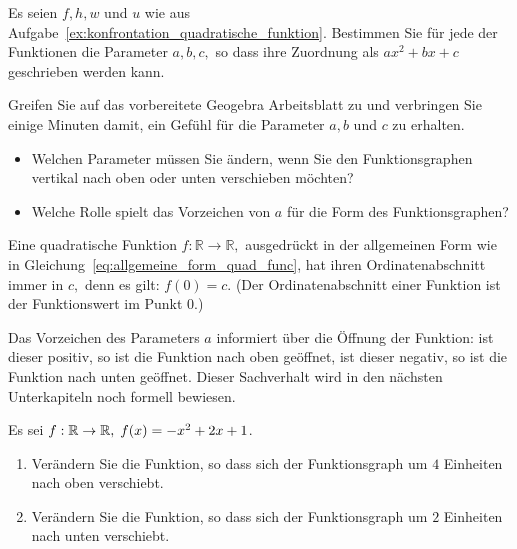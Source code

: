 \documentclass[12pt]{article}
\begin{document}
\begin{exercise}\label{ex:quad_func_allgemein_params}
Es seien $f, h, w$ und $u$ wie aus Aufgabe~\ref{ex:konfrontation_quadratische_funktion}. Bestimmen Sie für jede der Funktionen die Parameter $a,b,c,$ so dass ihre Zuordnung als $ax^2 + bx + c$ geschrieben werden kann.
\end{exercise}

\begin{exercise}\label{ex:quad_func_allgemein_einfluss_params}
Greifen Sie auf das vorbereitete Geogebra Arbeitsblatt zu und verbringen Sie einige Minuten damit, ein Gefühl für die Parameter $a,b$ und $c$ zu erhalten.
\begin{itemize}
\item Welchen Parameter müssen Sie ändern, wenn Sie den Funktionsgraphen vertikal nach oben oder unten verschieben möchten?
\item Welche Rolle spielt das Vorzeichen von $a$ für die Form des Funktionsgraphen?
\end{itemize}
\end{exercise}
\begin{remark}
Eine quadratische Funktion $f: \mathbb{R} \rightarrow \mathbb{R},$ ausgedrückt in der allgemeinen Form wie in Gleichung~\ref{eq:allgemeine_form_quad_func}, hat ihren Ordinatenabschnitt immer in $c,$ denn es gilt: $f(0) = c$. (Der Ordinatenabschnitt einer Funktion ist der Funktionswert im Punkt $0$.)

Das Vorzeichen des Parameters $a$ informiert über die Öffnung der Funktion: ist dieser positiv, so ist die Funktion nach oben geöffnet, ist dieser negativ, so ist die Funktion nach unten geöffnet. Dieser Sachverhalt wird in den nächsten Unterkapiteln noch formell bewiesen.
\end{remark}

\begin{exercise}\label{ex:quad_func_allgemein_einfluss_param_c}
Es sei $f: \mathbb{R} \rightarrow \mathbb{R}, \; f(x) = -x^2 + 2x + 1$.
\begin{enumerate}
\item Verändern Sie die Funktion, so dass sich der Funktionsgraph um $4$ Einheiten nach oben verschiebt.
\item Verändern Sie die Funktion, so dass sich der Funktionsgraph um $2$ Einheiten nach unten verschiebt.
\end{enumerate}
\end{exercise}
%
\newpage
\end{document}

